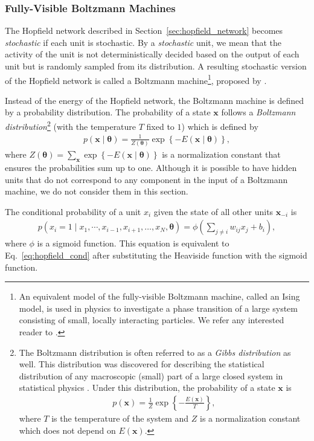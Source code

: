 \documentclass[dissertation,nocontribution]{aaltoseries}
\newcommand{\vect}[1]{\mathbf{#1}}
\newcommand{\vects}[1]{\boldsymbol{#1}}
\newcommand{\vx}[0]{\vect{x}}
\newcommand{\TT}[0]{{\vects{\theta}}}
\begin{document}
\subsubsection{Fully-Visible Boltzmann Machines}
\label{sec:fvbm}

The Hopfield network described in
Section~\ref{sec:hopfield_network} becomes
\textit{stochastic} if each unit is stochastic.
By a \textit{stochastic} unit, we mean that the activity of
the unit is not deterministically decided based on the
output of each unit but is randomly sampled from its
distribution.  A resulting stochastic version of the Hopfield
network is called a Boltzmann machine\footnote{ An
equivalent model of the fully-visible Boltzmann machine,
called an Ising model, is used in physics to investigate a
phase transition of a large system consisting of small,
locally interacting particles. We refer any interested
reader to \citep[][and references therein]{Cipra1987}.},
proposed by \citet{Ackley1985}. 

Instead of the energy of the Hopfield network, the Boltzmann
machine is defined by a probability distribution. The
probability of a state $\vx$ follows a \textit{Boltzmann
distribution}\footnote{The Boltzmann distribution is often
referred to as a \textit{Gibbs distribution} as well. This
distribution was discovered for describing the statistical
distribution of any macroscopic (small) part of a large
closed system in statistical physics \citep[see,
e.g.,][]{Landau1980}. Under this distribution, the
probability of a state $\vx$ is
\begin{align*}
    p(\vx) = \frac{1}{Z} \exp\left\{ -\frac{E(\vx)}{T}
    \right\},
\end{align*}
where $T$ is the temperature of the system and $Z$ is a
normalization constant which does not depend on $E(\vx)$.
}
(with the temperature $T$ fixed to $1$) which is
defined by
\begin{align}
    \label{eq:bm}
    p(\vx \mid \TT) = \frac{1}{Z(\TT)} \exp \left\{
    -E\left(\vx \mid \TT \right)\right\},
\end{align}
where $Z(\TT)=\sum_{\vx} \exp\left\{ -E(\vx \mid \TT)
\right\}$ is a normalization constant that ensures the
probabilities sum up to one. Although it is possible to have
hidden units that do not correspond to any component in the
input of a Boltzmann machine, we do not consider them in this
section.

The conditional probability of a unit $x_i$ given the state
of all other units $\vx_{-i}$ is
\begin{align}
    \label{eq:bm_cond}
    p(x_i = 1 \mid x_1, \cdots, x_{i-1}, x_{i+1}, \dots ,x_N,
    \TT) = \phi\left( \sum_{j \neq i} w_{ij} x_j + b_i
    \right),
\end{align}
where $\phi$ is a sigmoid function. This equation is equivalent
to Eq.~\eqref{eq:hopfield_cond} after substituting the Heaviside
function with the sigmoid function. 
\end{document}
